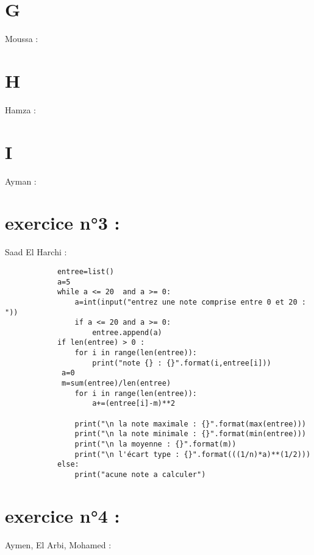 \documentclass{article}
\begin{document}
	\section{G}
        \begin{center}
    		Moussa :
	\end{center} 
	
	\section{H}
        \begin{center}
    		Hamza :
	\end{center} 

	\section{I}
	\begin{center}
    		Ayman :
	\end{center} 
	
\section{exercice n°3 :}
        \begin{center}
    		Saad El Harchi :
	\end{center}    	  
        	
    	\begin{verbatim}
			entree=list()
			a=5
			while a <= 20  and a >= 0:
    			a=int(input("entrez une note comprise entre 0 et 20 : "))
    			if a <= 20 and a >= 0:
        			entree.append(a) 
			if len(entree) > 0 :
    			for i in range(len(entree)):
        			print("note {} : {}".format(i,entree[i]))
   			 a=0
   			 m=sum(entree)/len(entree)
    			for i in range(len(entree)):
        			a+=(entree[i]-m)**2
    
    			print("\n la note maximale : {}".format(max(entree)))
    			print("\n la note minimale : {}".format(min(entree)))
    			print("\n la moyenne : {}".format(m))
    			print("\n l'écart type : {}".format(((1/n)*a)**(1/2)))
			else:
    			print("acune note a calculer")
		\end{verbatim}

\section{exercice n°4 :}
	\begin{center}
    		Aymen, El Arbi, Mohamed :
	\end{center}
	\begin{verbatim}
		
	\end{verbatim}
\end{document}
